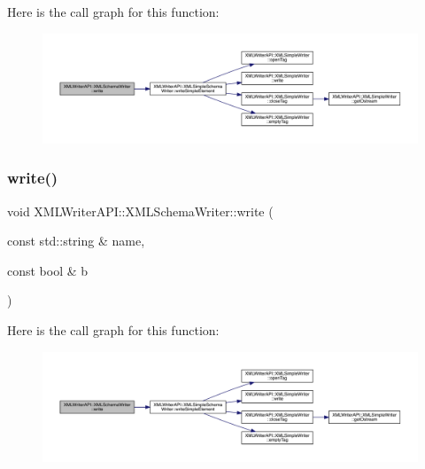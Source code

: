 Here is the call graph for this function\+:
\nopagebreak
\begin{figure}[H]
\begin{center}
\leavevmode
\includegraphics[width=350pt]{db/d34/classXMLWriterAPI_1_1XMLSchemaWriter_aaa0138613c826e77a63e5195bc742f07_cgraph}
\end{center}
\end{figure}
\mbox{\label{classXMLWriterAPI_1_1XMLSchemaWriter_a0d6bf66ccbb217c4db704568f9c377fe}} 
\subsubsection{\texorpdfstring{write()}{write()}\hspace{0.1cm}{\footnotesize\ttfamily [13/15]}}
{\footnotesize\ttfamily void X\+M\+L\+Writer\+A\+P\+I\+::\+X\+M\+L\+Schema\+Writer\+::write (\begin{DoxyParamCaption}\item[{const std\+::string \&}]{name,  }\item[{const bool \&}]{b }\end{DoxyParamCaption})\hspace{0.3cm}{\ttfamily [inline]}}

Here is the call graph for this function\+:
\nopagebreak
\begin{figure}[H]
\begin{center}
\leavevmode
\includegraphics[width=350pt]{db/d34/classXMLWriterAPI_1_1XMLSchemaWriter_a0d6bf66ccbb217c4db704568f9c377fe_cgraph}
\end{center}
\end{figure}
\mbox{\label{classXMLWriterAPI_1_1XMLSchemaWriter_a0d6bf66ccbb217c4db704568f9c377fe}} 
